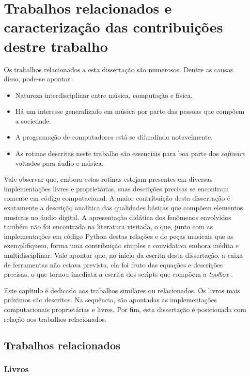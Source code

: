 \chapter{Trabalhos relacionados e caracterização das contribuições destre trabalho}
\label{cap:trabalhosRelacionados}

Os trabalhos relacionados a esta dissertação são numerosos. Dentre as causas disso, pode-se apontar:

\begin{itemize}
    \item Natureza interdisciplinar entre música, computação e física.
    \item Há um interesse generalizado em música por parte das pessoas que compõem a sociedade.
    \item A programação de computadores está se difundindo notavelmente.
    \item As rotinas descritas neste trabalho são essenciais para boa parte dos \emph{software} voltados para áudio e música.
\end{itemize}

Vale observar que, embora estas rotinas estejam presentes em diversas implementações livres e proprietárias, suas descrições precisas se encontram somente em código computacional. A maior contribuição desta dissertação é exatamente a descrição analítica das qualidades básicas que compõem elementos musicais no áudio digital. A apresentação didática dos fenômenos envolvidos também não foi encontrada na literatura visitada, o que, junto com as implementações em código Python destas relações e de peças musicais que as exemplifiquem, forma uma contribuição simples e convidativa embora inédita e multidisciplinar. Vale apontar que, no início da escrita desta dissertação, a caixa de ferramentas não estava prevista, ela foi fruto das equações e descrições precisas, o que tornou imediata a escrita dos scripts que compõem a \emph{toolbox} \massa.

Este capítulo é dedicado aos trabalhos similares ou relacionados. Os livros mais próximos são descritos. Na sequência, são apontadas as implementações computacionais proprietárias e livres. Por fim, esta dissertação é posicionada com relação aos trabalhos relacionados.

\section{Trabalhos relacionados}

\subsection{Livros}

